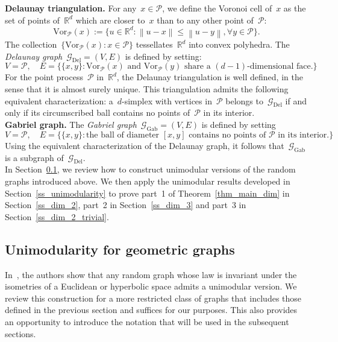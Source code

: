 \documentclass[a4paper,11pt]{article}
\newcommand{\RR}{\mathbb{R}}
\newcommand\norm[1]{\left\lVert#1\right\rVert}
\theoremstyle{definition}
\begin{document}
\noindent \textbf{Delaunay triangulation.} For any~$x \in \mathcal P$, we define the Voronoi cell of~$x$ as the set of points of~$\RR^d$ which are closer to~$x$ than to any other point of~$\mathcal P$: $$\mathrm{Vor}_\mathcal{P}(x) := \{ u \in \RR^d: \norm{ u - x } \leq \norm{ u -y }, \forall y \in \mathcal P \}.$$
The collection~$\{\mathrm{Vor}_\mathcal{P}(x): x \in \mathcal P\}$ tessellates~$\RR^d$ into convex polyhedra. The \emph{Delaunay graph}~$\mathcal G_\mathrm{Del} = (V,E)$ is defined by setting:
$$ V = \mathcal P, \quad E = \{ \{x,y\}: \mathrm{Vor}_\mathcal{P}(x) \text{ and } \mathrm{Vor}_\mathcal{P}(y) \text{ share a } (d-1)\text{-dimensional face.} \}$$
For the point process~$\mathcal P$ in~$\mathbb{R}^d$, the Delaunay triangulation is well defined, in the sense that it is almost surely unique. This triangulation admits the following equivalent characterization: a~$d$-simplex with vertices in~$\mathcal P$ belongs to~$\mathcal G_\mathrm{Del}$ if and only if its circumscribed ball contains no points of~$\mathcal P$ in its interior. \\

\noindent \textbf{Gabriel graph.} The \emph{Gabriel graph}~$\mathcal G_\mathrm{Gab} = (V,E)$ is defined by setting 
$$ V = \mathcal P, \quad E = \{ \{x,y\}: \text{the ball of diameter } [x,y] \text{ contains no points of } \mathcal P \text{ in its interior.} \} $$
Using the equivalent characterization of the Delaunay graph, it follows that~$\mathcal G_\mathrm{Gab}$ is a subgraph of~$\mathcal G_\mathrm{Del}$. \\

In Section~\ref{ss_mass_transport_principle}, we review how to construct unimodular versions of the random graphs introduced above. We then apply the unimodular results developed in Section~\ref{ss_unimodularity} to prove part~1 of Theorem~\ref{thm_main_dim} in Section~\ref{ss_dim_2}, part~2 in Section~\ref{ss_dim_3} and part~3 in Section~\ref{ss_dim_2_trivial}.

\subsection{Unimodularity for geometric graphs}\label{ss_mass_transport_principle}
In~\cite[Example~9.5]{AldousLyons2007}, the authors show that any random graph whose law is invariant under the isometries of a Euclidean or hyperbolic space admits a unimodular version. We review this construction for a more restricted class of graphs that includes those defined in the previous section and suffices for our purposes. This also provides an opportunity to introduce the notation that will be used in the subsequent sections. \\
\end{document}
